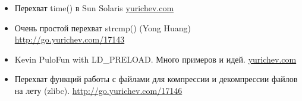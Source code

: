 \begin{itemize}
\item
Перехват time() в Sun Solaris \href{http://go.yurichev.com/17144}{yurichev.com}

\item
Очень простой перехват strcmp() (Yong Huang) 
\url{http://go.yurichev.com/17143}

\item
Kevin Pulo\EMDASH{}Fun with LD\_PRELOAD. Много примеров и идей.
\href{http://go.yurichev.com/17145}{yurichev.com}

\item
Перехват функций работы с файлами для компрессии и декомпрессии файлов на лету (zlibc). \url{http://go.yurichev.com/17146}

\end{itemize}
